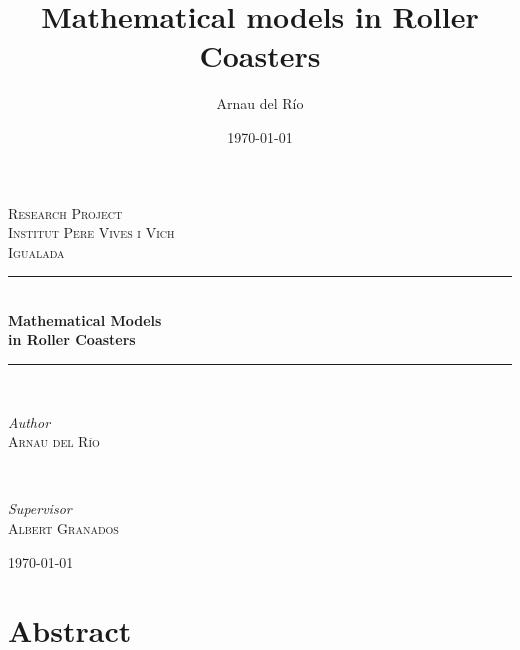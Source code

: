 \documentclass[12pt,twoside,a4paper]{article}
\title{Mathematical models in Roller Coasters}
\author{Arnau del Río}
\date{\today}
\begin{document}
	\begin{titlepage}
		\newcommand{\HRule}{\rule{\linewidth}{0.5mm}}
	
		\centering
		
		\vfill
		
		\textsc{\LARGE Research Project}\\[1.5cm]
		
		\textsc{\Large Institut Pere Vives i Vich}\\[0.5cm]
		
		\textsc{\large Igualada}\\[0.5cm]
		
		\HRule\\[0.8cm]
		
		{\huge\bfseries Mathematical Models}\\[0.5cm]

		{\huge\bfseries in Roller Coasters}\\[0.6cm]
		
		\HRule\\[2cm]
		
		\begin{minipage}{0.4\textwidth}
			\begin{flushleft}
				\large
				\textit{Author}\\
				\textsc{Arnau del Río}
			\end{flushleft}
		\end{minipage}
		~
		\begin{minipage}{0.4\textwidth}
			\begin{flushright}
				\large
				\textit{Supervisor}\\
				\textsc{Albert Granados}
			\end{flushright}
		\end{minipage}
		
		\vfill
		
		{\large\mydate\today}
		
		\vfill
	\end{titlepage}

	\thispagestyle{empty}
	
	\cleardoublepage
	
	\setcounter{page}{1}
	
	\addtocontents{toc}{\vspace*{-10mm}\begin{flushright}
		\textbf{Page}
	\end{flushright}\par}
	
	\section*{Abstract}
	
\end{document}

